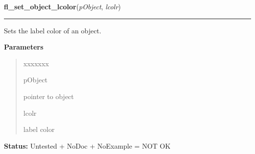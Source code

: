 \hspace{.8\funcindent}\begin{boxedminipage}{\funcwidth}

    \raggedright \textbf{fl\_set\_object\_lcolor}(\textit{pObject}, \textit{lcolr})

    \vspace{-1.5ex}

    \rule{\textwidth}{0.5\fboxrule}
\setlength{\parskip}{2ex}
    Sets the label color of an object.

\setlength{\parskip}{1ex}
      \textbf{Parameters}
      \vspace{-1ex}

      \begin{quote}
        \begin{Ventry}{xxxxxxx}

          \item[pObject]

          pointer to object

          \item[lcolr]

          label color

        \end{Ventry}

      \end{quote}

\textbf{Status:} Untested + NoDoc + NoExample = NOT OK



    \end{boxedminipage}

    \label{xformslib:library:fl_get_object_lcol}

    \vspace{0.5ex}


